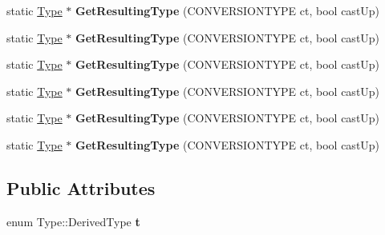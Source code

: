 \begin{DoxyCompactItemize}
\item 
\hypertarget{classType_afa5124325ffb607ae18ec77aa8793784}{static \hyperlink{classType}{Type} $\ast$ {\bfseries Get\-Resulting\-Type} (C\-O\-N\-V\-E\-R\-S\-I\-O\-N\-T\-Y\-P\-E ct, bool cast\-Up)}\label{classType_afa5124325ffb607ae18ec77aa8793784}

\item 
\hypertarget{classType_afa5124325ffb607ae18ec77aa8793784}{static \hyperlink{classType}{Type} $\ast$ {\bfseries Get\-Resulting\-Type} (C\-O\-N\-V\-E\-R\-S\-I\-O\-N\-T\-Y\-P\-E ct, bool cast\-Up)}\label{classType_afa5124325ffb607ae18ec77aa8793784}

\item 
\hypertarget{classType_afa5124325ffb607ae18ec77aa8793784}{static \hyperlink{classType}{Type} $\ast$ {\bfseries Get\-Resulting\-Type} (C\-O\-N\-V\-E\-R\-S\-I\-O\-N\-T\-Y\-P\-E ct, bool cast\-Up)}\label{classType_afa5124325ffb607ae18ec77aa8793784}

\item 
\hypertarget{classType_afa5124325ffb607ae18ec77aa8793784}{static \hyperlink{classType}{Type} $\ast$ {\bfseries Get\-Resulting\-Type} (C\-O\-N\-V\-E\-R\-S\-I\-O\-N\-T\-Y\-P\-E ct, bool cast\-Up)}\label{classType_afa5124325ffb607ae18ec77aa8793784}

\item 
\hypertarget{classType_afa5124325ffb607ae18ec77aa8793784}{static \hyperlink{classType}{Type} $\ast$ {\bfseries Get\-Resulting\-Type} (C\-O\-N\-V\-E\-R\-S\-I\-O\-N\-T\-Y\-P\-E ct, bool cast\-Up)}\label{classType_afa5124325ffb607ae18ec77aa8793784}

\item 
\hypertarget{classType_afa5124325ffb607ae18ec77aa8793784}{static \hyperlink{classType}{Type} $\ast$ {\bfseries Get\-Resulting\-Type} (C\-O\-N\-V\-E\-R\-S\-I\-O\-N\-T\-Y\-P\-E ct, bool cast\-Up)}\label{classType_afa5124325ffb607ae18ec77aa8793784}

\end{DoxyCompactItemize}
\subsection*{Public Attributes}
\begin{DoxyCompactItemize}
\item 
\hypertarget{classType_a61e8b1da54bc206c702082b8be2783a5}{enum Type\-::\-Derived\-Type {\bfseries t}}\label{classType_a61e8b1da54bc206c702082b8be2783a5}

\end{DoxyCompactItemize}
